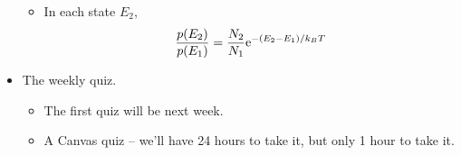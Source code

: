 \documentclass[../notes.tex]{subfiles}
\begin{document}
\begin{itemize}
\begin{itemize}
        \item In each state $E_2$,
        \begin{equation*}
            \frac{p(E_2)}{p(E_1)} = \frac{N_2}{N_1}\e[-(E_2-E_1)/k_BT]
        \end{equation*}
    \end{itemize}
    \item The weekly quiz.
    \begin{itemize}
        \item The first quiz will be next week.
        \item A Canvas quiz -- we'll have 24 hours to take it, but only 1 hour to take it.
    \end{itemize}
\end{itemize}
\end{document}
